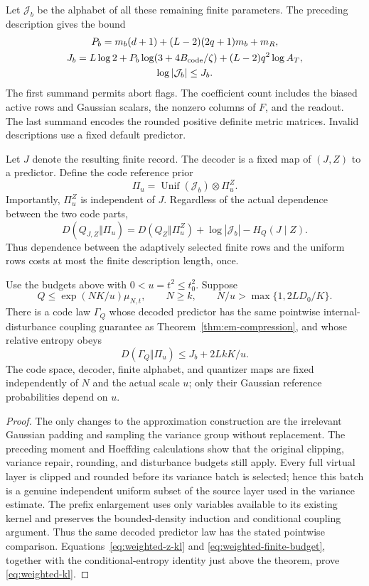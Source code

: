 Let $\mathcal J_b$ be the alphabet of all these remaining finite
parameters. The preceding description gives the bound
\begin{equation}\label{eq:weighted-finite-budget}
 \begin{gathered}
 P_b=m_b(d+1)+(L-2)(2q+1)m_b+m_R,\\
 J_b=L\log2+P_b\log(3+4B_{\rm code}/\zeta)
                     +(L-2)q^2\log A_T,\\
 \log|\mathcal J_b|\le J_b.
 \end{gathered}
\end{equation}
The first summand permits abort flags. The coefficient count includes
the biased active rows and Gaussian scalars, the nonzero columns of
$F$, and the readout. The last summand encodes the rounded positive
definite metric matrices. Invalid descriptions use a fixed default
predictor.

Let $J$ denote the resulting finite record. The decoder is a fixed map
of $(J,Z)$ to a predictor. Define the code reference prior
\[
 \Pi_u=\operatorname{Unif}(\mathcal J_b)\otimes\Pi_u^Z.
\]
Importantly, $\Pi_u^Z$ is independent of $J$. Regardless of the actual
dependence between the two code parts,
\[
 D(Q_{J,Z}\Vert\Pi_u)
 =D(Q_Z\Vert\Pi_u^Z)+\log|\mathcal J_b|-H_Q(J\mid Z).
\]
Thus dependence between the adaptively selected finite rows and the
uniform rows costs at most the finite description length, once.

\begin{theorem}
\label{thm:weighted-code-kl}
Use the budgets above with $0<u=t^2\le t_0^2$. Suppose
\[
 Q\le \exp(NK/u)\mu_{N,t},\qquad N\ge k,\qquad
 N/u>\max\{1,2LD_0/K\}.
\]
There is a code law $\Gamma_Q$ whose decoded predictor has the same
pointwise internal-disturbance coupling guarantee as
Theorem~\ref{thm:em-compression}, and whose relative entropy obeys
\begin{equation}\label{eq:weighted-kl}
 D(\Gamma_Q\Vert\Pi_u)\le J_b+2LkK/u.
\end{equation}
The code space, decoder, finite alphabet, and quantizer maps are fixed
independently of $N$ and the actual scale $u$; only their Gaussian reference probabilities
depend on $u$.
\end{theorem}
\begin{proof}
The only changes to the approximation construction are the irrelevant
Gaussian padding and sampling the variance group without replacement.
The preceding moment and Hoeffding calculations show that the original
clipping, variance repair, rounding, and disturbance budgets still apply.
Every full virtual layer is clipped and rounded before its variance batch
is selected; hence this batch is a genuine independent uniform subset of
the source layer used in the variance estimate. The prefix enlargement
uses only variables available to its existing kernel and preserves the
bounded-density induction and conditional coupling argument. Thus the
same decoded predictor law has the stated pointwise comparison.
Equations~\eqref{eq:weighted-z-kl} and
\eqref{eq:weighted-finite-budget}, together with the conditional-entropy
identity just above the theorem, prove \eqref{eq:weighted-kl}.
\end{proof}


